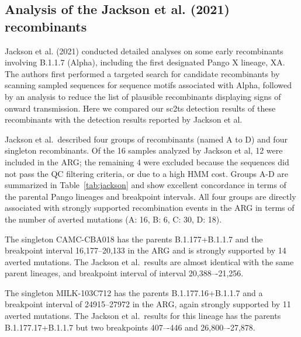 \documentclass[12pt,letterpaper]{article}
\begin{document}
\subsection*{Analysis of the Jackson et al. (2021) recombinants}
Jackson et al. (2021) conducted detailed analyses on some early recombinants
involving B.1.1.7 (Alpha), including the first designated Pango X lineage, XA.
The authors first performed a targeted search for candidate recombinants by
scanning sampled sequences for sequence motifs associated with Alpha, followed
by an analysis to reduce the list of plausible recombinants displaying signs of
onward transmission. Here we compared our sc2ts detection results of these
recombinants with the detection results reported by Jackson et al.

Jackson et al.\ described four groups of recombinants (named A to D) and
four singleton recombinants.
Of the 16 samples analyzed by Jackson et al, 12 were included in the ARG;
the remaining 4 were excluded because the sequences did not pass the 
QC filtering criteria, or due to a high HMM cost. Groups A-D are summarized 
in Table~\ref{tab:jackson} and show excellent concordance in terms 
of the parental Pango lineages and breakpoint intervals. All four groups
are directly associated with strongly supported recombination events 
in the ARG in terms of the number of averted mutations 
(A: 16, B: 6, C: 30, D: 18). 

The singleton CAMC-CBA018 has 
the parents B.1.177+B.1.1.7 and the breakpoint interval 16,177--20,133 
in the ARG 
and is strongly supported by 14 averted mutations.
The Jackson et al.\ results are almost identical with the same parent lineages, 
and breakpoint interval of interval 20,388–-21,256.

The singleton MILK-103C712 has 
the parents B.1.177.16+B.1.1.7 and a breakpoint interval of 24915--27972 
in the ARG, again strongly supported by 11 averted mutations.
The Jackson et al.\ results for this lineage has 
the parents B.1.177.17+B.1.1.7 but two breakpoints 407–-446 and 26,800–-27,878.
\end{document}
